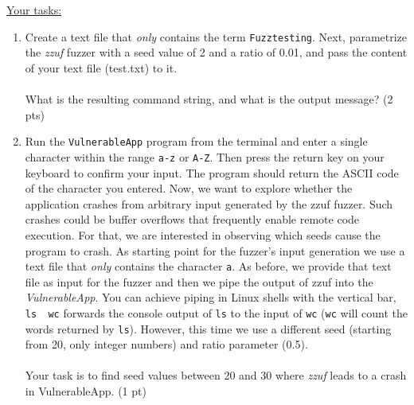 \documentclass [11pt, a4wide, twoside]{article}
\begin{document}
\underline{Your tasks:}
\begin{enumerate}[label=\alph*)]
\item Create a text file that \emph{only} contains the term \texttt{Fuzztesting}. 
Next, parametrize the \emph{zzuf} fuzzer with a seed value of 2 and a ratio of 0.01, and pass the content of your text file (\eg test.txt) to it.\\\\What is the resulting command string, and what is the output message? (2 pts)
\item Run the \texttt{VulnerableApp} program from the terminal and enter a single character within the range \texttt{a-z} or \texttt{A-Z}. Then press the return key on your keyboard to confirm your input.
The program should return the ASCII code of the character you entered.
Now, we want to explore whether the application crashes from arbitrary input generated by the zzuf fuzzer.
Such crashes could be buffer overflows that frequently enable remote code execution.
For that, we are interested in observing which seeds cause the program to crash.
As starting point for the fuzzer's input generation we use a text file that \emph{only} contains the character \texttt{a}.
As before, we provide that text file as input for the fuzzer and then we pipe the output of zzuf into the \emph{VulnerableApp}. You can achieve piping in Linux shells with the vertical bar, \eg \texttt{ls \textbar~wc} forwards the console output of \texttt{ls} to the input of \texttt{wc} (\texttt{wc} will count the words returned by \texttt{ls}). However, this time we use a different seed (starting from 20, only integer numbers) and ratio parameter (0.5).\\\\
Your task is to find seed values between 20 and 30 where \emph{zzuf} leads to a crash in VulnerableApp. (1 pt)
\end{enumerate}
\end{document}
